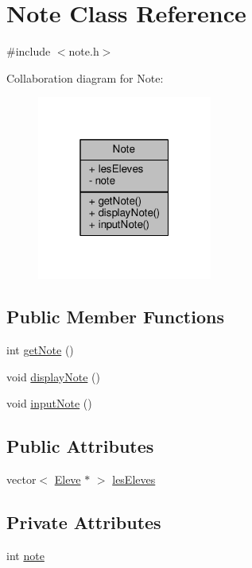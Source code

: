\hypertarget{class_note}{\section{Note Class Reference}
\label{class_note}
}


{\ttfamily \#include $<$note.\+h$>$}



Collaboration diagram for Note\+:\nopagebreak
\begin{figure}[H]
\begin{center}
\leavevmode
\includegraphics[width=163pt]{class_note__coll__graph}
\end{center}
\end{figure}
\subsection*{Public Member Functions}
\begin{DoxyCompactItemize}
\item 
int \hyperlink{class_note_a880f020b1e9fe974fd2a3064af3257c6}{get\+Note} ()
\item 
void \hyperlink{class_note_ae9f2d7513a834ad2198a66e50a1ba38b}{display\+Note} ()
\item 
void \hyperlink{class_note_a2232542d07b8c3657c0e43da23afaedf}{input\+Note} ()
\end{DoxyCompactItemize}
\subsection*{Public Attributes}
\begin{DoxyCompactItemize}
\item 
vector$<$ \hyperlink{class_eleve}{Eleve} $\ast$ $>$ \hyperlink{class_note_a9e61b19e4928a16b63e5dd9c4fee859b}{les\+Eleves}
\end{DoxyCompactItemize}
\subsection*{Private Attributes}
\begin{DoxyCompactItemize}
\item 
int \hyperlink{class_note_a3cb5f22dd5374f4e3c59c5f11dc7fbfb}{note}
\end{DoxyCompactItemize}


